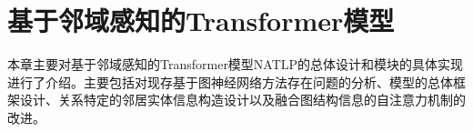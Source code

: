 \chapter{基于邻域感知的Transformer模型}


本章主要对基于邻域感知的Transformer模型NATLP的总体设计和模块的具体实现进行了介绍。主要包括对现存基于图神经网络方法存在问题的分析、模型的总体框架设计、关系特定的邻居实体信息构造设计以及融合图结构信息的自注意力机制的改进。








